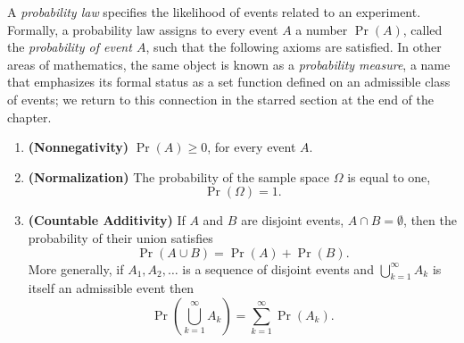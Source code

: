 A \emph{probability law} specifies the likelihood of events related to an experiment.
Formally, a probability law assigns to every event $A$ a number $\Pr (A)$, called the \emph{probability of event $A$}, such that the following axioms are satisfied.
In other areas of mathematics, the same object is known as a \emph{probability measure}, a name that emphasizes its formal status as a set function defined on an admissible class of events; we return to this connection in the starred section at the end of the chapter.
\begin{enumerate}
\item \textbf{(Nonnegativity)} $\Pr (A) \geq 0$, for every event $A$.
\item \textbf{(Normalization)} The probability of the sample space $\Omega$ is equal to one,
\begin{equation*}
\Pr (\Omega) = 1 .
\end{equation*}
\item \textbf{(Countable Additivity)} If $A$ and $B$ are disjoint events, $A \cap B = \emptyset$, then the probability of their union satisfies
\begin{equation*}
\Pr (A \cup B) = \Pr (A) + \Pr (B) .
\end{equation*}
More generally, if $A_1, A_2, \ldots$ is a sequence of disjoint events and $\bigcup_{k=1}^{\infty} A_k$ is itself an admissible event then
\begin{equation*}
\Pr \left( \bigcup_{k=1}^{\infty} A_k \right)
= \sum_{k = 1}^{\infty} \Pr (A_k) .
\end{equation*}
\end{enumerate}

